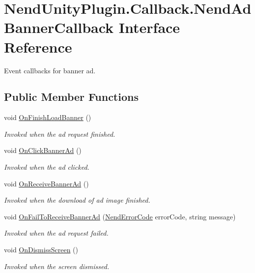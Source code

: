 \hypertarget{interface_nend_unity_plugin_1_1_callback_1_1_nend_ad_banner_callback}{}\section{Nend\+Unity\+Plugin.\+Callback.\+Nend\+Ad\+Banner\+Callback Interface Reference}
\label{interface_nend_unity_plugin_1_1_callback_1_1_nend_ad_banner_callback}


Event callbacks for banner ad.  


\subsection*{Public Member Functions}
\begin{DoxyCompactItemize}
\item 
void \hyperlink{interface_nend_unity_plugin_1_1_callback_1_1_nend_ad_banner_callback_a771f73ba86097ac97269f23deadb23d7}{On\+Finish\+Load\+Banner} ()
\begin{DoxyCompactList}\small\item\em Invoked when the ad request finished. \end{DoxyCompactList}\item 
void \hyperlink{interface_nend_unity_plugin_1_1_callback_1_1_nend_ad_banner_callback_a859c277cd0c2f8d96f49522bdc37ed89}{On\+Click\+Banner\+Ad} ()
\begin{DoxyCompactList}\small\item\em Invoked when the ad clicked. \end{DoxyCompactList}\item 
void \hyperlink{interface_nend_unity_plugin_1_1_callback_1_1_nend_ad_banner_callback_a5322feea8a922ddfa3222da60fc7b096}{On\+Receive\+Banner\+Ad} ()
\begin{DoxyCompactList}\small\item\em Invoked when the download of ad image finished. \end{DoxyCompactList}\item 
void \hyperlink{interface_nend_unity_plugin_1_1_callback_1_1_nend_ad_banner_callback_a2a4cbc8e58169faf300427a99865ec59}{On\+Fail\+To\+Receive\+Banner\+Ad} (\hyperlink{namespace_nend_unity_plugin_1_1_common_a9bcb251827acb8ae5f3a35fc9de7195e}{Nend\+Error\+Code} error\+Code, string message)
\begin{DoxyCompactList}\small\item\em Invoked when the ad request failed. \end{DoxyCompactList}\item 
void \hyperlink{interface_nend_unity_plugin_1_1_callback_1_1_nend_ad_banner_callback_a469b2edd8d1a51292d93cf96a0c6bb1e}{On\+Dismiss\+Screen} ()
\begin{DoxyCompactList}\small\item\em Invoked when the screen dismissed. \end{DoxyCompactList}\end{DoxyCompactItemize}


